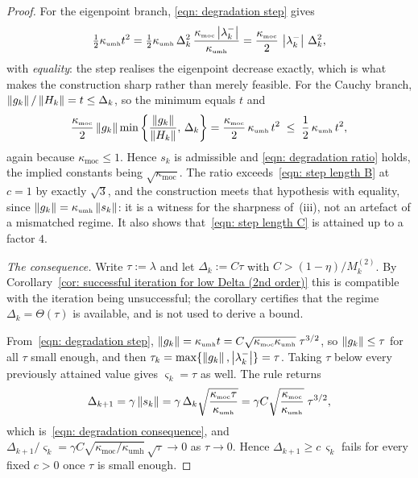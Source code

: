 \documentclass[11pt]{article}
\theoremstyle{plain}
\theoremstyle{definition}
\theoremstyle{remark}
\numberwithin{equation}{section}
\providecommand{\defeq}{\mathrel{:=}}
\newcommand*\mykappa[1]{\kappa_{\scriptscriptstyle\text{#1}}}
\begin{document}
\begin{proof}
    For the eigenpoint branch, \eqref{eqn: degradation step} gives
    \begin{equation*}
        \tfrac12\mykappa{umh}t^2
          = \tfrac12\mykappa{umh}\,\Delta_k^2\,
            \frac{\mykappa{moc}\abs{\lambda_k^-}}{\mykappa{umh}}
          = \frac{\mykappa{moc}}{2}\,\abs{\lambda_k^-}\,\Delta_k^2 ,
    \end{equation*}
    with \emph{equality}: the step realises the eigenpoint decrease exactly, which is what makes the
    construction sharp rather than merely feasible. For the Cauchy branch,
    $\left \lVert g_k \right \rVert/\left \lVert H_k \right \rVert = t \leq \Delta_k$, so the minimum equals $t$ and
    \begin{equation*}
        \frac{\mykappa{moc}}{2}\norm{g_k}
        \min\left\{\frac{\norm{g_k}}{\norm{H_k}},\, \Delta_k\right\}
        = \frac{\mykappa{moc}}{2}\,\mykappa{umh}\, t^2
        \;\leq\; \frac{1}{2}\,\mykappa{umh}\, t^2 ,
    \end{equation*}
    again because $\mykappa{moc} \leq 1$. Hence $s_k$ is admissible and
    \eqref{eqn: degradation ratio} holds, the implied constants being $\sqrt{\mykappa{moc}}$. The
    ratio exceeds~\eqref{eqn: step length B} at $c = 1$ by exactly $\sqrt3$, and the construction
    meets that hypothesis with equality, since $\norm{g_k} = \mykappa{umh}\norm{s_k}$: it is a
    witness for the sharpness of~(iii), not an artefact of a mismatched regime. It also shows
    that~\eqref{eqn: step length C} is attained up to a factor $4$.

    \emph{The consequence.} Write $\tau \defeq \lambda$ and let $\Delta_k \defeq C\tau$ with
    $C > (1-\eta)/M_k^{(2)}$. By
    Corollary~\ref{cor: successful iteration for low Delta (2nd order)} this is compatible with the
    iteration being unsuccessful; the corollary certifies that the regime $\Delta_k = \Theta(\tau)$
    is available, and is not used to derive a bound.

    From~\eqref{eqn: degradation step},
    $\norm{g_k} = \mykappa{umh}t = C\sqrt{\mykappa{moc}\mykappa{umh}}\;\tau^{3/2}$, so
    $\left \lVert g_k \right \rVert \leq \tau$ for all $\tau$ small enough, and then
    $\tau_k = \max\{\left \lVert g_k \right \rVert, \left \vert \lambda_k^- \right \vert\} = \tau$. Taking $\tau$ below every previously
    attained value gives $\varsigma_k = \tau$ as well. The rule returns
    \begin{equation*}
        \Delta_{k+1} = \gamma\norm{s_k} = \gamma\,\Delta_k
            \sqrt{\frac{\mykappa{moc}\tau}{\mykappa{umh}}}
        = \gamma C \sqrt{\frac{\mykappa{moc}}{\mykappa{umh}}}\;\tau^{3/2} ,
    \end{equation*}
    which is~\eqref{eqn: degradation consequence}, and
    $\Delta_{k+1}/\varsigma_k = \gamma C\sqrt{\mykappa{moc}/\mykappa{umh}}\,\sqrt{\tau} \to 0$ as
    $\tau \to 0$. Hence $\Delta_{k+1} \geq c\,\varsigma_k$ fails for every fixed $c > 0$ once $\tau$
    is small enough.
\end{proof}
\end{document}

